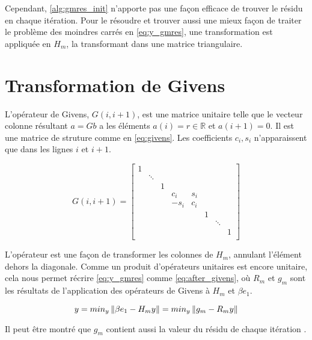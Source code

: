     Cependant, \ref{alg:gmres_init} n'apporte pas une façon efficace de trouver le résidu en chaque itération. Pour le résoudre et trouver aussi une mieux façon de traiter le problème des moindres carrés en \ref{eq:y_gmres}, une transformation est appliquée en $H_{m}$, la transformant dans une matrice triangulaire.

    \section{Transformation de Givens}

    L'opérateur de Givens, $G(i,i+1)$, est une matrice unitaire telle que le vecteur colonne résultant $a = Gb$ a les éléments $a(i) = r \in \mathbb{R}$ et $a(i+1)=0$. Il est une matrice de struture comme en \ref{eq:givens}. Les coefficients $c_{i},s_{i}$ n'apparaissent que dans les lignes $i$ et $i+1$.

    \begin{equation}\label{eq:givens}
    G(i,i+1)=
    \begin{bmatrix}
            1 & & & & & & & \\
             &\ddots & & & & & & \\
             & & 1 & & & & & \\
              & & & c_{i}& s_{i} & & & \\
            & & & -s_{i}& c_{i} & & & \\
            & & & & & 1& & \\
            & & & & & & \ddots& \\
            & & & & & & & 1\\
    \end{bmatrix}
    \end{equation}

    L'opérateur est une façon de transformer les colonnes de $H_{m}$, annulant l'élément dehors la diagonale. Comme un produit d'opérateurs unitaires est encore unitaire, cela nous permet récrire \ref{eq:y_gmres} comme \ref{eq:after_givens}, où $R_{m}$ et $g_{m}$ sont les résultats de l'application des opérateurs de Givens à $H_{m}$ et $\beta e_{1}$.

    \begin{equation}\label{eq:after_givens}
        y = min_{y} \left\lVert\beta e_{1} - H_{m}y\right\rVert = min_{y} \left\lVert g_{m} - R_{m}y\right\rVert
    \end{equation}

    Il peut être montré que $g_{m}$ contient aussi la valeur du résidu de chaque itération \cite{saad2003iterative}.

